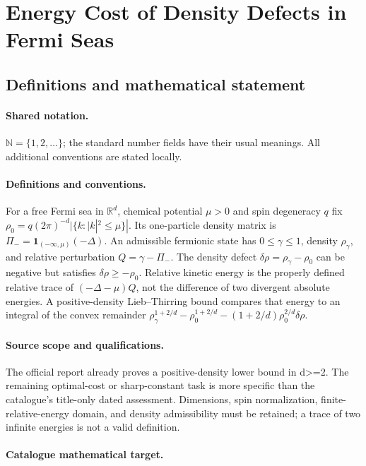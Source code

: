 \documentclass[11pt]{article}
\begin{document}
\section{Energy Cost of Density Defects in Fermi Seas}\label{statement}

\subsection{Definitions and mathematical statement}

\paragraph{Shared notation.}$\mathbb N=\{1,2,\ldots\}$; the standard number fields have their usual meanings. All additional conventions are stated locally.


\paragraph{Definitions and conventions.} For a free Fermi sea in $\mathbb R^d$, chemical potential $\mu>0$ and spin degeneracy $q$ fix $\rho_0=q(2\pi)^{-d}|\{k:|k|^2\le\mu\}|$. Its one-particle density matrix is $\Pi_-=\mathbf1_{(-\infty,\mu)}(-\Delta)$. An admissible fermionic state has $0\le\gamma\le1$, density $\rho_\gamma$, and relative perturbation $Q=\gamma-\Pi_-$. The density defect $\delta\rho=\rho_\gamma-\rho_0$ can be negative but satisfies $\delta\rho\ge-\rho_0$. Relative kinetic energy is the properly defined relative trace of $(-\Delta-\mu)Q$, not the difference of two divergent absolute energies. A positive-density Lieb--Thirring bound compares that energy to an integral of the convex remainder $\rho_\gamma^{1+2/d}-\rho_0^{1+2/d}-(1+2/d)\rho_0^{2/d}\delta\rho$.

\paragraph{Source scope and qualifications.} The official report already proves a positive-density lower bound in d>=2. The remaining optimal-cost or sharp-constant task is more specific than the catalogue's title-only dated assessment. Dimensions, spin normalization, finite-relative-energy domain, and density admissibility must be retained; a trace of two infinite energies is not a valid definition.

\paragraph{Catalogue mathematical target.}
\end{document}
